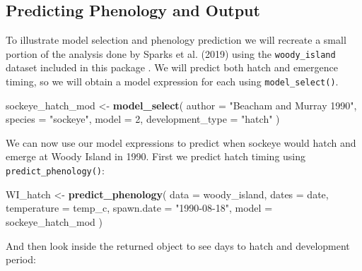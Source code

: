 \documentclass[webpdf,large,contemporary,namedate]{oup-authoring-template}
\newenvironment{Shaded}{\begin{snugshade}}{\end{snugshade}}
\newcommand{\AttributeTok}[1]{\textcolor[rgb]{0.13,0.29,0.53}{#1}}
\newcommand{\DecValTok}[1]{\textcolor[rgb]{0.00,0.00,0.81}{#1}}
\newcommand{\FunctionTok}[1]{\textcolor[rgb]{0.13,0.29,0.53}{\textbf{#1}}}
\newcommand{\NormalTok}[1]{#1}
\newcommand{\OtherTok}[1]{\textcolor[rgb]{0.56,0.35,0.01}{#1}}
\newcommand{\SpecialCharTok}[1]{\textcolor[rgb]{0.81,0.36,0.00}{\textbf{#1}}}
\newcommand{\StringTok}[1]{\textcolor[rgb]{0.31,0.60,0.02}{#1}}
\theoremstyle{thmstyleone}
\theoremstyle{thmstyletwo}
\theoremstyle{thmstylethree}
\begin{document}
\subsection{Predicting Phenology and
Output}\label{predicting-phenology-and-output}

To illustrate model selection and phenology prediction we will recreate
a small portion of the analysis done by Sparks et al. (2019) using the
\texttt{woody\_island} dataset included in this package . We will
predict both hatch and emergence timing, so we will obtain a model
expression for each using \texttt{model\_select()}.

\begin{Shaded}
\begin{Highlighting}[]
\NormalTok{sockeye\_hatch\_mod }\OtherTok{\textless{}{-}} \FunctionTok{model\_select}\NormalTok{(}
  \AttributeTok{author =} \StringTok{"Beacham and Murray 1990"}\NormalTok{, }
  \AttributeTok{species =} \StringTok{"sockeye"}\NormalTok{, }
  \AttributeTok{model =} \DecValTok{2}\NormalTok{, }
  \AttributeTok{development\_type =} \StringTok{"hatch"}
\NormalTok{  )}
\end{Highlighting}
\end{Shaded}

We can now use our model expressions to predict when sockeye would hatch
and emerge at Woody Island in 1990. First we predict hatch timing using
\texttt{predict\_phenology()}:

\begin{Shaded}
\begin{Highlighting}[]
\NormalTok{WI\_hatch }\OtherTok{\textless{}{-}} \FunctionTok{predict\_phenology}\NormalTok{(}
  \AttributeTok{data =}\NormalTok{ woody\_island,}
  \AttributeTok{dates =}\NormalTok{ date,}
  \AttributeTok{temperature =}\NormalTok{ temp\_c,}
  \AttributeTok{spawn.date =} \StringTok{"1990{-}08{-}18"}\NormalTok{,}
  \AttributeTok{model =}\NormalTok{ sockeye\_hatch\_mod}
\NormalTok{  )}
\end{Highlighting}
\end{Shaded}

And then look inside the returned object to see days to hatch and
development period:

\begin{Shaded}
\end{Shaded}
\end{document}
